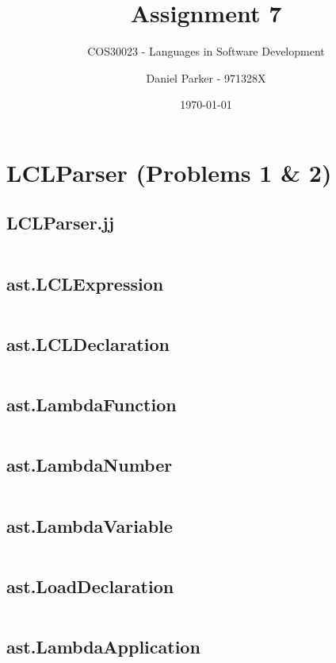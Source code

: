 \documentclass[11pt, numbers=endperiod, parskip=half]{scrartcl}
\title{Assignment 7}
\subtitle{COS30023 - Languages in Software Development}
\author{Daniel Parker - 971328X}
\date{\today}
\begin{document}

\maketitle
\section{LCLParser (Problems 1 \& 2)}
\subsection{LCLParser.jj}
\inputminted[tabsize=2]{java}{LCLParser/src/LCLParser.jj}

\subsection{ast.LCLExpression}
\inputminted[tabsize=2]{java}{LCLParser/src/ast/LCLExpression.java}

\subsection{ast.LCLDeclaration}
\inputminted[tabsize=2]{java}{LCLParser/src/ast/LCLDeclaration.java}

\subsection{ast.LambdaFunction}
\inputminted[tabsize=2]{java}{LCLParser/src/ast/LambdaFunction.java}

\subsection{ast.LambdaNumber}
\inputminted[tabsize=2]{java}{LCLParser/src/ast/LambdaNumber.java}

\subsection{ast.LambdaVariable}
\inputminted[tabsize=2]{java}{LCLParser/src/ast/LambdaVariable.java}

\subsection{ast.LoadDeclaration}
\inputminted[tabsize=2]{java}{LCLParser/src/ast/LoadDeclaration.java}

\subsection{ast.LambdaApplication}
\inputminted[tabsize=2]{java}{LCLParser/src/ast/LambdaApplication.java}
\end{document}
